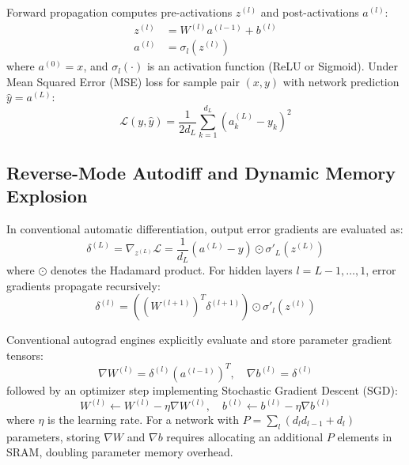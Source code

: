 \documentclass[conference]{IEEEtran}
\begin{document}
Forward propagation computes pre-activations $z^{(l)}$ and post-activations $a^{(l)}$:
\begin{align}
    z^{(l)} &= W^{(l)} a^{(l-1)} + b^{(l)} \\
    a^{(l)} &= \sigma_l\left(z^{(l)}\right)
\end{align}
where $a^{(0)} = x$, and $\sigma_l(\cdot)$ is an activation function (ReLU or Sigmoid). Under Mean Squared Error (MSE) loss for sample pair $(x, y)$ with network prediction $\hat{y} = a^{(L)}$:
\begin{equation}
    \mathcal{L}(y, \hat{y}) = \frac{1}{2 d_L} \sum_{k=1}^{d_L} \left(a_k^{(L)} - y_k\right)^2
\end{equation}

\subsection{Reverse-Mode Autodiff and Dynamic Memory Explosion}
In conventional automatic differentiation, output error gradients are evaluated as:
\begin{equation}
    \delta^{(L)} = \nabla_{z^{(L)}} \mathcal{L} = \frac{1}{d_L} \left(a^{(L)} - y\right) \odot \sigma'_L\left(z^{(L)}\right)
\end{equation}
where $\odot$ denotes the Hadamard product. For hidden layers $l = L-1, \dots, 1$, error gradients propagate recursively:
\begin{equation}
    \delta^{(l)} = \left(\left(W^{(l+1)}\right)^T \delta^{(l+1)}\right) \odot \sigma'_l\left(z^{(l)}\right)
    \label{eq:backprop_recurrence}
\end{equation}

Conventional autograd engines explicitly evaluate and store parameter gradient tensors:
\begin{equation}
    \nabla W^{(l)} = \delta^{(l)} \left(a^{(l-1)}\right)^T, \quad \nabla b^{(l)} = \delta^{(l)}
\end{equation}
followed by an optimizer step implementing Stochastic Gradient Descent (SGD):
\begin{equation}
    W^{(l)} \leftarrow W^{(l)} - \eta \nabla W^{(l)}, \quad b^{(l)} \leftarrow b^{(l)} - \eta \nabla b^{(l)}
\end{equation}
where $\eta$ is the learning rate. For a network with $P = \sum_l (d_l d_{l-1} + d_l)$ parameters, storing $\nabla W$ and $\nabla b$ requires allocating an additional $P$ elements in SRAM, doubling parameter memory overhead.
\end{document}
